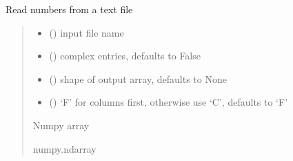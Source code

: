 \documentclass[letterpaper,10pt,english]{sphinxmanual}
\begin{document}
\begin{fulllineitems}
\label{\detokenize{spinbox:spinbox.core.read_from_file}}
\pysigstartsignatures
{}
\pysigstopsignatures
\sphinxAtStartPar
Read numbers from a text file
\begin{quote}\begin{description}
\begin{itemize}
\item {} 
\sphinxAtStartPar
{} () \textendash{} input file name

\item {} 
\sphinxAtStartPar
{} (\sphinxstyleliteralemphasis{\sphinxupquote{, }}) \textendash{} complex entries, defaults to False

\item {} 
\sphinxAtStartPar
{} (\sphinxstyleliteralemphasis{\sphinxupquote{, }}) \textendash{} shape of output array, defaults to None

\item {} 
\sphinxAtStartPar
{} (\sphinxstyleliteralemphasis{\sphinxupquote{, }}) \textendash{} ‘F’ for columns first, otherwise use ‘C’, defaults to ‘F’

\end{itemize}

\sphinxAtStartPar
Numpy array

\sphinxAtStartPar
numpy.ndarray

\end{description}\end{quote}

\end{fulllineitems}
\end{document}
